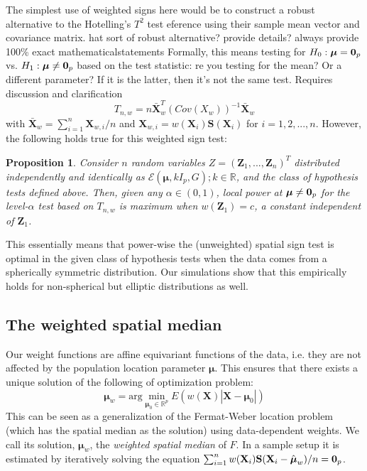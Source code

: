 \documentclass[12pt,letterpaper]{article}
\newcommand{\bfS}{{\mathbf {S}}}
\newcommand{\bfX}{{\mathbf {X}}}
\newcommand{\bfZ}{{\mathbf {Z}}}
\newcommand{\bfmu}{{\boldsymbol{\mu}}}
\def\bredbf#1\eredbf{{\color{red}{\bf ???? #1 ????}}}
\newtheorem{Proposition}{Proposition}[section]
\theoremstyle{Example}
\begin{document}
 The simplest use of weighted signs here would be to construct a robust alternative to the 
 Hotelling's $T^2$ test \bredbf reference \eredbf using their sample mean vector and 
 covariance matrix. \bredbf what sort of robust alternative? provide details? always 
 provide 100\% exact mathematicalstatements \eredbf 
 Formally, 
 this means testing for $H_0: \bfmu = {\bf 0}_p$ vs. $H_1:\bfmu \neq {\bf 0}_p$  based 
 on the test statistic: \bredbf are you testing for the mean? Or a different parameter? 
 If it is the latter, then it's not the same test. Requires discussion and clarification \eredbf
%
$$ T_{n,w} = n \bar\bfX_w^T ( Cov (X_w))^{-1} \bar\bfX_w $$
%
with $\bar\bfX_w = \sum_{i=1}^n \bfX_{w,i}/n$ 
and $\bfX_{w,i} = w(\bfX_i ) \bfS (\bfX_i)$ for $i=1,2,...,n$. 
However, the following holds true for this weighted sign test:
%
\begin{Proposition}
Consider $n$ random variables $Z = (\bfZ_1,...,\bfZ_n)^T$ distributed independently and 
identically as $\mathcal{E}( \bfmu, kI_p, G); k \in \mathbb R$, and the class of hypothesis tests defined above. Then, given any $\alpha \in (0,1)$, local power 
at $\bfmu \neq {\bf 0}_p$ for the level-$\alpha$ test  based on $T_{n,w}$ is maximum when $w(\bfZ_1) = c$, a constant independent of $\bfZ_1$.
\end{Proposition}
%
\noindent This essentially means that power-wise the (unweighted) spatial sign test \citep{OjaBook10} is optimal in the given class of hypothesis tests when the data comes from a spherically symmetric distribution. Our simulations show that this empirically holds for non-spherical but elliptic distributions as well.

\subsection{The weighted spatial median} 

Our weight functions are affine equivariant functions of the data, i.e. they are not affected by the population location parameter $\bfmu$. This ensures that there exists a unique solution of the following of optimization problem:
%
$$
\bfmu_w = \text{arg}\min_{\bfmu_0 \in \mathbb{R}^p} E ( w(\bfX) | \bfX - \bfmu_0 |)
$$
%
 This can be seen as a generalization of the Fermat-Weber location problem (which has the spatial median \citep{brown83, Chaudhuri96} as the solution) using data-dependent weights. We call its solution, $\bfmu_w$, the \textit{weighted spatial median} of $F$. In a sample setup it is estimated by iteratively solving the equation $\sum_{i=1}^n w(\bfX_i) \bfS (\bfX_i - \hat\bfmu_w)/n = {\bf 0}_p$.
\end{document}
